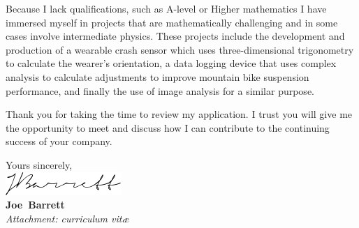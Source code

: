 \documentclass{article}
\def\firstname{Joe}
\def\surname{Barrett}
\def\FileAuthor{\firstname\ \surname}
\begin{document}
Because I lack qualifications, such as A-level or Higher mathematics I have immersed myself in projects that are mathematically challenging and in some cases involve intermediate physics. These projects include the development and production of a wearable crash sensor which uses three-dimensional trigonometry to calculate the wearer's orientation, a data logging device that uses complex analysis to calculate adjustments to improve mountain bike suspension performance, and finally the use of image analysis for a similar purpose.

Thank you for taking the time to review my application. I trust you will give me the opportunity to meet and discuss how I can contribute to the continuing success of your company.

Yours sincerely,\\[2em]

%
\includegraphics{../sig.png}\\
{\bfseries \FileAuthor}\\
%
\vfill%
{\slshape Attachment: curriculum vit\ae{}}
\end{document}

